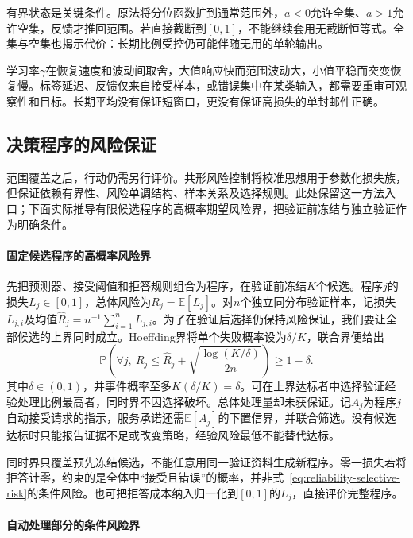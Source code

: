有界状态是关键条件。原法将分位函数扩到通常范围外，$a<0$允许全集、$a>1$允许空集，反馈才推回范围。若直接截断到$[0,1]$，不能继续套用无截断恒等式。全集与空集也揭示代价：长期比例受控仍可能伴随无用的单轮输出。

学习率$\gamma$在恢复速度和波动间取舍，大值响应快而范围波动大，小值平稳而突变恢复慢。标签延迟、反馈仅来自接受样本，或错误集中在某类输入，都需要重审可观察性和目标。长期平均没有保证短窗口，更没有保证高损失的单封邮件正确。

\subsection{决策程序的风险保证}

范围覆盖之后，行动仍需另行评价。共形风险控制将校准思想用于参数化损失族，但保证依赖有界性、风险单调结构、样本关系及选择规则。此处保留这一方法入口；下面实际推导有限候选程序的高概率期望风险界，把验证前冻结与独立验证作为明确条件。

\paragraph{固定候选程序的高概率风险界}

先把预测器、接受阈值和拒答规则组合为程序，在验证前冻结$K$个候选。程序$j$的损失$L_j\in[0,1]$，总体风险为$R_j=\mathbb E[L_j]$。对$n$个独立同分布验证样本，记损失$L_{j,i}$及均值$\hat R_j=n^{-1}\sum_{i=1}^{n}L_{j,i}$。为了在验证后选择仍保持风险保证，我们要让全部候选的上界同时成立。Hoeffding界将单个失败概率设为$\delta/K$，联合界便给出
\begin{equation}
 \mathbb P\left(
  \forall j,\ R_j\leq
  \hat R_j+\sqrt{\frac{\log(K/\delta)}{2n}}
 \right)\geq1-\delta.
 \label{eq:reliability-finite-program-bound}
\end{equation}
其中$\delta\in(0,1)$，并事件概率至多$K(\delta/K)=\delta$。可在上界达标者中选择验证经验处理比例最高者，同时界不因选择破坏。总体处理量却未获保证。记$A_j$为程序$j$自动接受请求的指示，服务承诺还需$\mathbb E[A_j]$的下置信界，并联合筛选。没有候选达标时只能报告证据不足或改变策略，经验风险最低不能替代达标。

同时界只覆盖预先冻结候选，不能任意用同一验证资料生成新程序。零一损失若将拒答计零，约束的是全体中“接受且错误”的概率，并非式~\eqref{eq:reliability-selective-risk}的条件风险。也可把拒答成本纳入归一化到$[0,1]$的$L_j$，直接评价完整程序。

\paragraph{自动处理部分的条件风险界}

